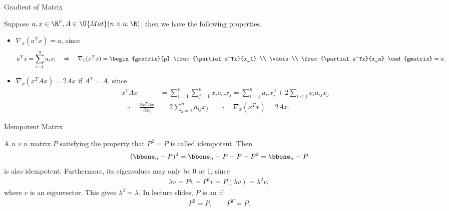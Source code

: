 \begin{frame}{Gradient of Matrix}

\justifying
{} Suppose $a, x\in \R^n, A\in \U{Mat}(n\times n; \R)$, then we have the following properties.
\begin{itemize}
	\item $\nabla_x(a^Tx) = a$, since
	\begin{align*}
	a^Tx = \sum_{i=1}^n a_ix_i \quad\Rightarrow\quad \nabla_x (x^Tx) = 
	\begin{gmatrix}[p]
	\frac{\partial a^Tx}{x_1} \\ \vdots \\ \frac{\partial a^Tx}{x_n}
	\end{gmatrix} = a.
	\end{align*}
	\item $\nabla_x (x^TAx) = 2Ax$ if $A^T = A$, since
	\begin{align*}
	x^TAx & = \sum_{i=1}^n\sum_{j=1}^n x_ia_{ij}x_j = \sum_{i=1}^n a_{ii}x_i^2 + 2\sum_{i< j} x_ia_{ij}x_j \\
	\Rightarrow\quad \frac{\partial x^TAx}{\partial x_i} & = 2\sum_{j=1}^n a_{ij}x_j\quad\Rightarrow\quad \nabla_x (x^Tx) = 2Ax.
	\end{align*}
\end{itemize}


\end{frame}


\begin{frame}{Idempotent Matrix}

\justifying
{} A $n\times n$ matrix $P$ satisfying the property that $P^2 = P$ is called idempotent. Then
\begin{align*}
(\bbone_n - P)^2 = \bbone_n - P - P + P^2 = \bbone_n - P
\end{align*}
is also idempotent. Furthermore, its eigenvalues may only be 0 or 1, since
\begin{align*}
\lambda v = Pv = P^2v = P(\lambda v) = \lambda^2v,
\end{align*}
where $v$ is an eigenvector. This gives $\lambda^2 = \lambda$. In lecture slides, $P$ is an  if
\begin{align*}
P^2 = P, \qquad P^T = P.
\end{align*}

\end{frame}


